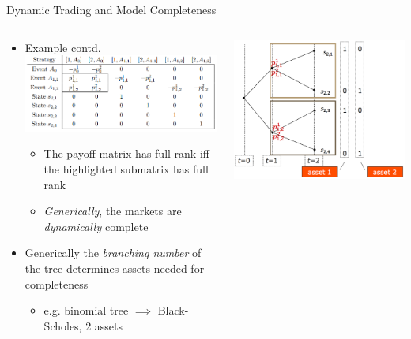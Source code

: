 \documentclass[aspectratio=1610]{beamer}
\begin{document}
\begin{frame}{Dynamic Trading and Model Completeness}
\begin{columns}
\begin{column}{0.6\textwidth}
  \begin{itemize}
    \item Example contd.
    \includegraphics[width=.85\textwidth]{images/trading-strategy.PNG}
    \begin{itemize}
      \item The payoff matrix has full rank iff the highlighted submatrix has full rank
      \item {\em Generically}, the markets are {\em dynamically} complete
    \end{itemize}
    \item Generically the {\em branching number} of the tree determines assets needed for completeness
    \begin{itemize}
      \item e.g. binomial tree $\implies$ Black-Scholes, 2 assets
    \end{itemize}
  \end{itemize}
\end{column}
\begin{column}{0.38\textwidth}
  \includegraphics[width=\textwidth]{images/long-lived.PNG}
\end{column}
\end{columns}
\end{frame}
\end{document}
